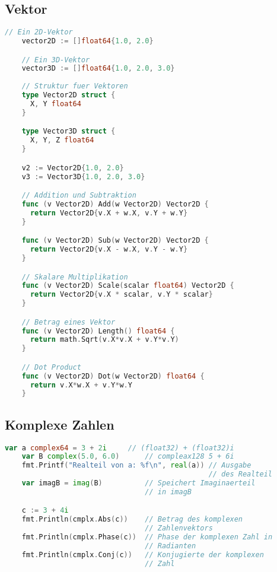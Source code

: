 \documentclass[twoside,a4paper,12pt]{article}
\begin{document}
\subsection{Vektor}
\begin{center}
  \begin{minipage}{1.0\textwidth}
   \begin{lstlisting}[language=Go]
    // Ein 2D-Vektor
    vector2D := []float64{1.0, 2.0}

    // Ein 3D-Vektor
    vector3D := []float64{1.0, 2.0, 3.0}
   
    // Struktur fuer Vektoren
    type Vector2D struct {
      X, Y float64
    }

    type Vector3D struct {
      X, Y, Z float64
    }

    v2 := Vector2D{1.0, 2.0}
    v3 := Vector3D{1.0, 2.0, 3.0}

    // Addition und Subtraktion
    func (v Vector2D) Add(w Vector2D) Vector2D {
      return Vector2D{v.X + w.X, v.Y + w.Y}
    }

    func (v Vector2D) Sub(w Vector2D) Vector2D {
      return Vector2D{v.X - w.X, v.Y - w.Y}
    }

    // Skalare Multiplikation
    func (v Vector2D) Scale(scalar float64) Vector2D {
      return Vector2D{v.X * scalar, v.Y * scalar}
    }

    // Betrag eines Vektor
    func (v Vector2D) Length() float64 {
      return math.Sqrt(v.X*v.X + v.Y*v.Y)
    }

    // Dot Product
    func (v Vector2D) Dot(w Vector2D) float64 {
      return v.X*w.X + v.Y*w.Y
    }
   \end{lstlisting} 
  \end{minipage}
  
\end{center}

\subsection{Komplexe Zahlen}
\begin{center}
  \begin{minipage}{1.0\textwidth}
    \begin{lstlisting}[language=Go]
    var a complex64 = 3 + 2i     // (float32) + (float32)i
    var B complex(5.0, 6.0)      // compleax128 5 + 6i
    fmt.Printf("Realteil von a: %f\n", real(a)) // Ausgabe 
                                                // des Realteil
    var imagB = imag(B)          // Speichert Imaginaerteil 
                                 // in imagB

    c := 3 + 4i
    fmt.Println(cmplx.Abs(c))    // Betrag des komplexen 
                                 // Zahlenvektors
    fmt.Println(cmplx.Phase(c))  // Phase der komplexen Zahl in 
                                 // Radianten
    fmt.Println(cmplx.Conj(c))   // Konjugierte der komplexen 
                                 // Zahl
	  \end{lstlisting}
  \end{minipage}
\end{center}
\end{document}
